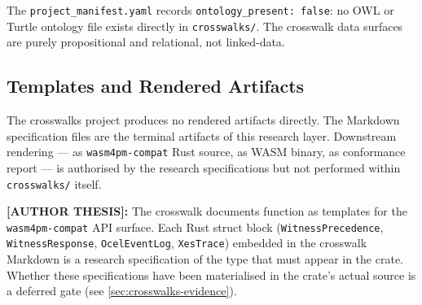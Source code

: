 The \texttt{project\_manifest.yaml} records \texttt{ontology\_present: false}: no \textsc{OWL}
or Turtle ontology file exists directly in \texttt{crosswalks/}. The crosswalk data surfaces are
purely propositional and relational, not linked-data.

\subsection{Templates and Rendered Artifacts}
\label{sec:crosswalks-impl-templates}

The crosswalks project produces no rendered artifacts directly. The Markdown specification files
are the terminal artifacts of this research layer. Downstream rendering --- as \texttt{wasm4pm-compat}
Rust source, as \textsc{WASM} binary, as conformance report --- is authorised by the research
specifications but not performed within \texttt{crosswalks/} itself.

\textbf{[AUTHOR THESIS]:} The crosswalk documents function as templates for the
\texttt{wasm4pm-compat} API surface. Each Rust struct block (\texttt{WitnessPrecedence},
\texttt{WitnessResponse}, \texttt{OcelEventLog}, \texttt{XesTrace}) embedded in the crosswalk
Markdown is a research specification of the type that must appear in the crate. Whether these
specifications have been materialised in the crate's actual source is a deferred gate
(see \textsection\ref{sec:crosswalks-evidence}).
